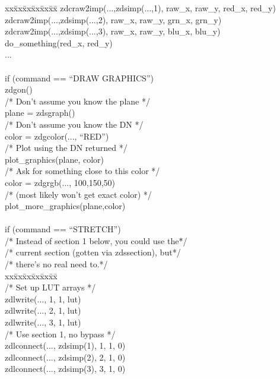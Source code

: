 \begin{tabbing}
xx\=xx\=xx\=xx\=xx\=xx\=\kill
\>\>\>zdcraw2imp(...,zdsimp(...,1), raw\_x, raw\_y, red\_x, red\_y)\\
\>\>\>zdcraw2imp(...,zdsimp(...,2), raw\_x, raw\_y, grn\_x, grn\_y)\\
\>\>\>zdcraw2imp(...,zdsimp(...,3), raw\_x, raw\_y, blu\_x, blu\_y)\\
\>\>\>do\_something(red\_x, red\_y)\\
\>\>\>...\\
\\
\>\>if (command == ``DRAW GRAPHICS'')\\
\>\>\>zdgon()\\
\>\>\>/*  Don't assume you know the plane  */\\
\>\>\>plane = zdsgraph()\\
\>\>\>/*  Don't assume you know the DN  */\\
\>\>\>color = zdgcolor(..., ``RED'')\\
\>\>\>/*  Plot using the DN returned  */\\
\>\>\>plot\_graphics(plane, color)\\
\>\>\>/*  Ask for something close to this color  */\\
\>\>\>color = zdgrgb(..., 100,150,50)\\
\>\>\>/*  (most likely won't get exact color)  */\\
\>\>\>plot\_more\_graphics(plane,color)\\
\\
\>\>if (command == ``STRETCH'')\\
\>\>\>/*  Instead of section 1 below, you could use the\=*/\\
\>\>\>/*  current section (gotten via zdssection), but\>*/\\
\>\>\>/*  there's no real need to.\>*/\\
xx\=xx\=xx\=xx\=xx\=xx\=\kill
\\
\>\>\>/*  Set up LUT arrays  */\\
\>\>\>zdlwrite(..., 1, 1, lut)\\
\>\>\>zdlwrite(..., 2, 1, lut)\\
\>\>\>zdlwrite(..., 3, 1, lut)\\
\>\>\>/*  Use section 1, no bypass  */\\
\>\>\>zdlconnect(..., zdsimp(1), 1, 1, 0)\\
\>\>\>zdlconnect(..., zdsimp(2), 2, 1, 0)\\
\>\>\>zdlconnect(..., zdsimp(3), 3, 1, 0)\\

\end{tabbing}
